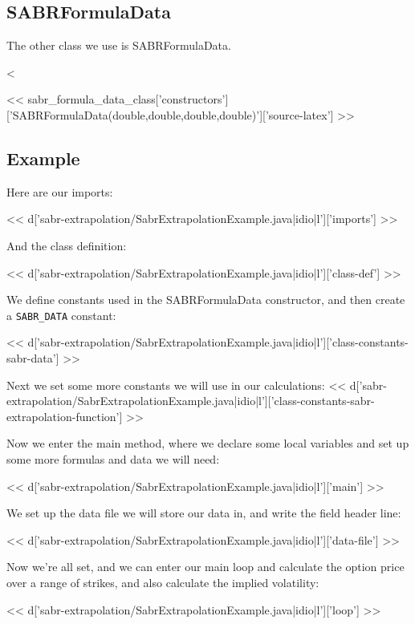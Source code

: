 \subsection{SABRFormulaData}

The other class we use is SABRFormulaData.

<%

<< sabr_formula_data_class['constructors']['SABRFormulaData(double,double,double,double)']['source-latex'] >>

\subsection{Example}

Here are our imports:

<< d['sabr-extrapolation/SabrExtrapolationExample.java|idio|l']['imports'] >>

And the class definition:

<< d['sabr-extrapolation/SabrExtrapolationExample.java|idio|l']['class-def'] >>

We define constants used in the SABRFormulaData constructor, and then create a
\verb|SABR_DATA| constant:

<< d['sabr-extrapolation/SabrExtrapolationExample.java|idio|l']['class-constants-sabr-data'] >>

Next we set some more constants we will use in our calculations:
<< d['sabr-extrapolation/SabrExtrapolationExample.java|idio|l']['class-constants-sabr-extrapolation-function'] >>

Now we enter the main method, where we declare some local variables and set up
some more formulas and data we will need:

<< d['sabr-extrapolation/SabrExtrapolationExample.java|idio|l']['main'] >>

We set up the data file we will store our data in, and write the field header line:

<< d['sabr-extrapolation/SabrExtrapolationExample.java|idio|l']['data-file'] >>

Now we're all set, and we can enter our main loop and calculate the option
price over a range of strikes, and also calculate the implied volatility:

<< d['sabr-extrapolation/SabrExtrapolationExample.java|idio|l']['loop'] >>

